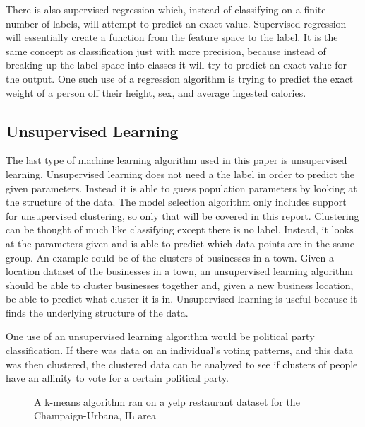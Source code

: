 \documentclass[9pt,twocolumn,twoside]{idsi}
\begin{document}
There is also supervised regression which, instead of classifying on a finite number of labels, will attempt to predict an exact value. Supervised regression will essentially create a function from the feature space to the label. It is the same concept as classification just with more precision, because instead of breaking up the label space into classes it will try to predict an exact value for the output. One such use of a regression algorithm is trying to predict the exact weight of a person off their height, sex, and average ingested calories.

\subsection{Unsupervised Learning}
The last type of machine learning algorithm used in this paper is unsupervised learning. Unsupervised learning does not need a the label in order to predict the given parameters. Instead it is able to guess population parameters by looking at the structure of the data. The model selection algorithm only includes support for unsupervised clustering, so only that will be covered in this report. Clustering can be thought of much like classifying except there is no label. Instead, it looks at the parameters given and is able to predict which data points are in the same group. An example could be of the clusters of businesses in a town. Given a location dataset of the businesses in a town, an unsupervised learning algorithm should be able to cluster businesses together and, given a new business location, be able to predict what cluster it is in. Unsupervised learning is useful because it finds the underlying structure of the data. 

One use of an unsupervised learning algorithm would be political party classification. If there was data on an individual's voting patterns, and this data was then clustered, the clustered data can be analyzed to see if clusters of people have an affinity to vote for a certain political party. 
\begin{figure}[htbp]
\centering{}
\caption{A k-means algorithm ran on a yelp restaurant dataset for the Champaign-Urbana, IL area}
\label{fig:KMeans}
\end{figure}
\end{document}
